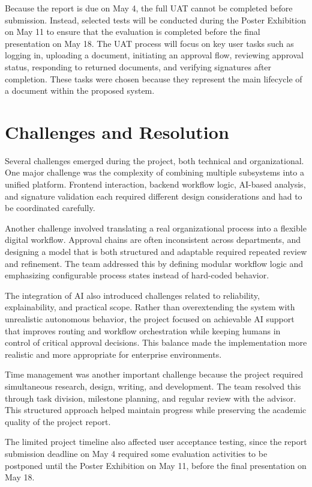 \documentclass[12pt,oneside,openright,a4paper]{cpe-english-project}
\begin{document}
Because the report is due on May 4, the full UAT cannot be completed before submission. Instead, selected tests will be conducted during the Poster Exhibition on May 11 to ensure that the evaluation is completed before the final presentation on May 18. The UAT process will focus on key user tasks such as logging in, uploading a document, initiating an approval flow, reviewing approval status, responding to returned documents, and verifying signatures after completion. These tasks were chosen because they represent the main lifecycle of a document within the proposed system.

\section{Challenges and Resolution}

Several challenges emerged during the project, both technical and organizational. One major challenge was the complexity of combining multiple subsystems into a unified platform. Frontend interaction, backend workflow logic, AI-based analysis, and signature validation each required different design considerations and had to be coordinated carefully.

Another challenge involved translating a real organizational process into a flexible digital workflow. Approval chains are often inconsistent across departments, and designing a model that is both structured and adaptable required repeated review and refinement. The team addressed this by defining modular workflow logic and emphasizing configurable process states instead of hard-coded behavior.

The integration of AI also introduced challenges related to reliability, explainability, and practical scope. Rather than overextending the system with unrealistic autonomous behavior, the project focused on achievable AI support that improves routing and workflow orchestration while keeping humans in control of critical approval decisions. This balance made the implementation more realistic and more appropriate for enterprise environments.

Time management was another important challenge because the project required simultaneous research, design, writing, and development. The team resolved this through task division, milestone planning, and regular review with the advisor. This structured approach helped maintain progress while preserving the academic quality of the project report.

The limited project timeline also affected user acceptance testing, since the report submission deadline on May 4 required some evaluation activities to be postponed until the Poster Exhibition on May 11, before the final presentation on May 18.
\end{document}
